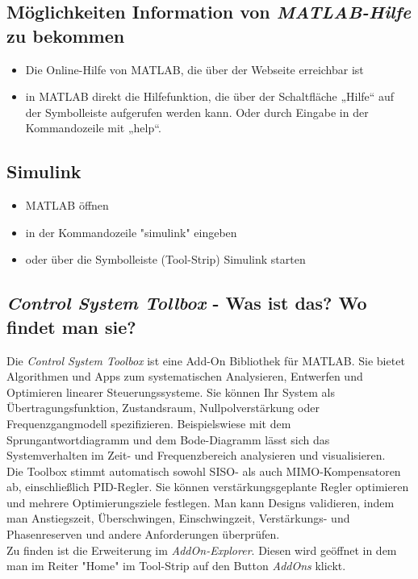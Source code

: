 \documentclass{article}
\begin{document}
		\subsection{Möglichkeiten Information von \textit{MATLAB-Hilfe} zu bekommen}
			\begin{itemize}
				\item Die Online-Hilfe von MATLAB, die über der Webseite erreichbar ist 
				\item in MATLAB direkt die Hilfefunktion, die über der Schaltfläche „Hilfe“ auf der Symbolleiste aufgerufen werden kann. Oder durch Eingabe in der Kommandozeile mit „help“. 
			\end{itemize}
		
		\subsection{Simulink}
			\begin{itemize}
				\item MATLAB öffnen
				\item in der Kommandozeile "simulink" eingeben
				\item oder über die Symbolleiste (Tool-Strip) Simulink starten
			\end{itemize}
		
		\subsection{\textit{Control System Tollbox} - Was ist das? Wo findet man sie?}
			Die \textit{Control System Toolbox} ist eine Add-On Bibliothek für MATLAB. Sie bietet Algorithmen und Apps zum systematischen Analysieren, Entwerfen und Optimieren linearer Steuerungssysteme. Sie können Ihr System als Übertragungsfunktion, Zustandsraum, Nullpolverstärkung oder Frequenzgangmodell spezifizieren. Beispielswiese mit dem Sprungantwortdiagramm und dem Bode-Diagramm lässt sich das Systemverhalten im Zeit- und Frequenzbereich analysieren und visualisieren. \\
			Die Toolbox stimmt automatisch sowohl SISO- als auch MIMO-Kompensatoren ab, einschließlich PID-Regler. Sie können verstärkungsgeplante Regler optimieren und mehrere Optimierungsziele festlegen. Man kann Designs validieren, indem man Anstiegszeit, Überschwingen, Einschwingzeit, Verstärkungs- und Phasenreserven und andere Anforderungen überprüfen. \\
			Zu finden ist die Erweiterung im \textit{AddOn-Explorer}. Diesen wird geöffnet in dem man im Reiter "Home" im Tool-Strip auf den Button \textit{AddOns} klickt.
		
\end{document}
